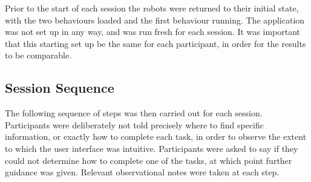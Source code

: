 Prior to the start of each session the robots were returned to their initial state, with the two behaviours loaded and the first behaviour running. The application was not set up in any way, and was run fresh for each session. It was important that this starting set up be the same for each participant, in order for the results to be comparable.

\subsection{Session Sequence}
The following sequence of steps was then carried out for each session. Participants were deliberately not told precisely where to find specific information, or exactly how to complete each task, in order to observe the extent to which the user interface was intuitive. Participants were asked to say if they could not determine how to complete one of the tasks, at which point further guidance was given. Relevant observational notes were taken at each step.

